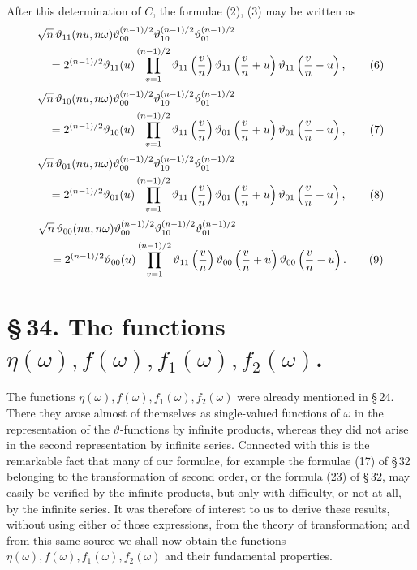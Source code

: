 \documentclass[11pt]{article}
\providecommand{\tht}{\vartheta}
\begin{document}
After this determination of $C$, the formulae (2), (3) may be written as
\begin{align}
&\sqrt n\,\tht_{11}(nu,n\omega)\tht_{00}^{(n-1)/2}\tht_{10}^{(n-1)/2}\tht_{01}^{(n-1)/2} \notag\\
&\quad=2^{(n-1)/2}\tht_{11}(u)\prod_{v=1}^{(n-1)/2}
\tht_{11}\left({v\over n}\right)
\tht_{11}\left({v\over n}+u\right)
\tht_{11}\left({v\over n}-u\right), \tag{6}
\end{align}
\begin{align}
&\sqrt n\,\tht_{10}(nu,n\omega)\tht_{00}^{(n-1)/2}\tht_{10}^{(n-1)/2}\tht_{01}^{(n-1)/2}\notag\\
&\quad=2^{(n-1)/2}\tht_{10}(u)\prod_{v=1}^{(n-1)/2}
\tht_{11}\left({v\over n}\right)
\tht_{01}\left({v\over n}+u\right)
\tht_{01}\left({v\over n}-u\right), \tag{7}
\end{align}
\begin{align}
&\sqrt n\,\tht_{01}(nu,n\omega)\tht_{00}^{(n-1)/2}\tht_{10}^{(n-1)/2}\tht_{01}^{(n-1)/2}\notag\\
&\quad=2^{(n-1)/2}\tht_{01}(u)\prod_{v=1}^{(n-1)/2}
\tht_{11}\left({v\over n}\right)
\tht_{01}\left({v\over n}+u\right)
\tht_{01}\left({v\over n}-u\right), \tag{8}
\end{align}
\begin{align}
&\sqrt n\,\tht_{00}(nu,n\omega)\tht_{00}^{(n-1)/2}\tht_{10}^{(n-1)/2}\tht_{01}^{(n-1)/2}\notag\\
&\quad=2^{(n-1)/2}\tht_{00}(u)\prod_{v=1}^{(n-1)/2}
\tht_{11}\left({v\over n}\right)
\tht_{00}\left({v\over n}+u\right)
\tht_{00}\left({v\over n}-u\right). \tag{9}
\end{align}

\section*{\S\,34. The functions $\eta(\omega), f(\omega), f_1(\omega), f_2(\omega)$.}

The functions $\eta(\omega), f(\omega), f_1(\omega), f_2(\omega)$ were already mentioned in \S\,24. There they arose almost of themselves as single-valued functions of $\omega$ in the representation of the $\vartheta$-functions by infinite products, whereas they did not arise in the second representation by infinite series. Connected with this is the remarkable fact that many of our formulae, for example the formulae (17) of \S\,32 belonging to the transformation of second order, or the formula (23) of \S\,32, may easily be verified by the infinite products, but only with difficulty, or not at all, by the infinite series. It was therefore of interest to us to derive these results, without using either of those expressions, from the theory of transformation; and from this same source we shall now obtain the functions $\eta(\omega), f(\omega), f_1(\omega), f_2(\omega)$ and their fundamental properties.
\end{document}
